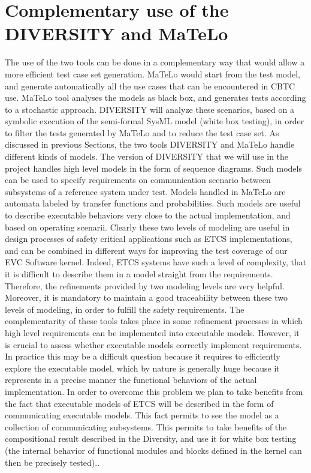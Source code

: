 \section{Complementary use of the DIVERSITY and MaTeLo}
The use of the two tools can be done in a complementary way that would
allow a more efficient test case set generation.  MaTeLo would start
from the test model, and generate automatically all the use cases that
can be encountered in CBTC use. MaTeLo tool analyses the models as
black box, and generates tests according to a stochastic approach.
DIVERSITY will analyze these scenarios, based on a symbolic execution
of the semi-formal SysML model (white box testing), in order to filter
the tests generated by MaTeLo and to reduce the test case set.  As
discussed in previous Sections, the two tools DIVERSITY and MaTeLo
handle different kinds of models. The version of DIVERSITY that we
will use in the project handles high level models in the form of
sequence diagrams. Such models can be used to specify requirements on
communication scenario between subsystems of a reference system under
test. Models handled in MaTeLo are automata labeled by transfer
functions and probabilities. Such models are useful to describe
executable behaviors very close to the actual implementation, and
based on operating scenarii. Clearly these two levels of modeling are
useful in design processes of safety critical applications such as
ETCS implementations, and can be combined in different ways for
improving the test coverage of our EVC Software kernel.  Indeed, ETCS
systems have such a level of complexity, that it is difficult to
describe them in a model straight from the requirements. Therefore,
the refinements provided by two modeling levels are very
helpful. Moreover, it is mandatory to maintain a good traceability
between these two levels of modeling, in order to fulfill the safety
requirements.  The complementarity of these tools takes place in some
refinement processes in which high level requirements can be
implemented into executable models. However, it is crucial to assess
whether executable models correctly implement requirements. In
practice this may be a difficult question because it requires to
efficiently explore the executable model, which by nature is generally
huge because it represents in a precise manner the functional
behaviors of the actual implementation.  In order to overcome this
problem we plan to take benefits from the fact that executable models
of ETCS will be described in the form of communicating executable
models. This fact permits to see the model as a collection of
communicating subsystems. This permits to take benefits of the
compositional result described in the Diversity, and use it for white
box testing (the internal behavior of functional modules and blocks
defined in the kernel can then be precisely tested)..


